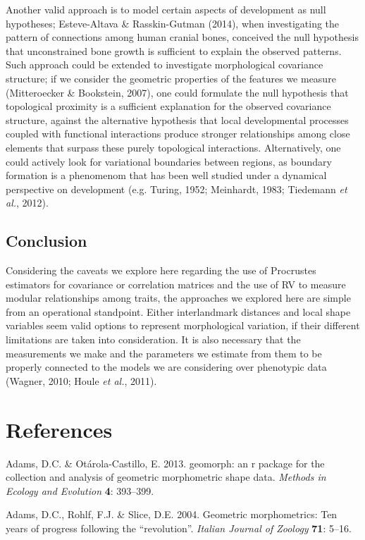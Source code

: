 \documentclass[12pt,]{article}
\begin{document}
Another valid approach is to model certain aspects of development as
null hypotheses; Esteve-Altava \& Rasskin-Gutman (2014), when
investigating the pattern of connections among human cranial bones,
conceived the null hypothesis that unconstrained bone growth is
sufficient to explain the observed patterns. Such approach could be
extended to investigate morphological covariance structure; if we
consider the geometric properties of the features we measure
(Mitteroecker \& Bookstein, 2007), one could formulate the null
hypothesis that topological proximity is a sufficient explanation for
the observed covariance structure, against the alternative hypothesis
that local developmental processes coupled with functional interactions
produce stronger relationships among close elements that surpass these
purely topological interactions. Alternatively, one could actively look
for variational boundaries between regions, as boundary formation is a
phenomenom that has been well studied under a dynamical perspective on
development (e.g. Turing, 1952; Meinhardt, 1983; Tiedemann \emph{et
al.}, 2012).

\subsection{Conclusion}\label{conclusion}

Considering the caveats we explore here regarding the use of Procrustes
estimators for covariance or correlation matrices and the use of RV to
measure modular relationships among traits, the approaches we explored
here are simple from an operational standpoint. Either interlandmark
distances and local shape variables seem valid options to represent
morphological variation, if their different limitations are taken into
consideration. It is also necessary that the measurements we make and
the parameters we estimate from them to be properly connected to the
models we are considering over phenotypic data (Wagner, 2010; Houle
\emph{et al.}, 2011).

\section*{References}\label{references}

Adams, D.C. \& Otárola-Castillo, E. 2013. geomorph: an r package for the
collection and analysis of geometric morphometric shape data.
\emph{Methods in Ecology and Evolution} \textbf{4}: 393--399.

Adams, D.C., Rohlf, F.J. \& Slice, D.E. 2004. Geometric morphometrics:
Ten years of progress following the ``revolution''. \emph{Italian
Journal of Zoology} \textbf{71}: 5--16.
\end{document}
